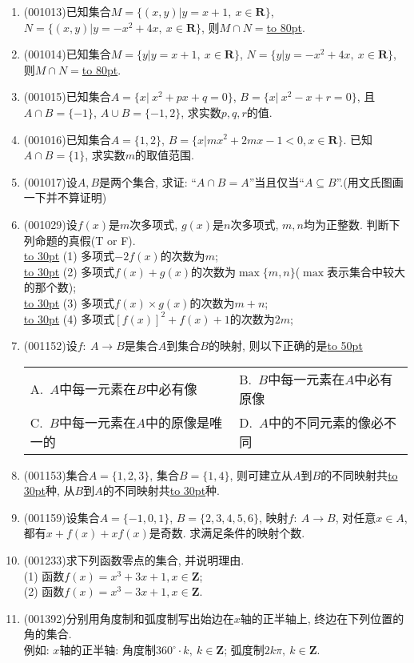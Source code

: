 \documentclass[10pt,a4paper]{article}
\newcommand{\blank}[1]{\underline{\hbox to #1pt{}}}
\newcommand{\twoch}[4]{\par\begin{tabular}{p{.46\textwidth}p{.46\textwidth}}
A.~#1& B.~#2\\
C.~#3& D.~#4
\end{tabular}}
\begin{document}
\begin{enumerate}[1.]
3. \blank{200};4. \blank{200}.
\item {\tiny (001013)}已知集合$M=\{(x,y)|y=x+1, \ x \in \mathbf{R}\}$, $N=\{(x,y)|y=-x^2+4x,\  x \in \mathbf{R}\}$,
则$M \cap N=$\blank{80}.
\item {\tiny (001014)}已知集合$M=\{y|y=x+1, \ x \in \mathbf{R}\}$, $N=\{y|y=-x^2+4x,\  x \in \mathbf{R}\}$,
则$M \cap N=$\blank{80}.
\item {\tiny (001015)}已知集合$A=\{x|\ x^2+px+q=0\}$, $B=\{x|\ x^2-x+r=0\}$, 且$A\cap B=\{-1\}$, $A\cup B=\{-1,2\}$, 求实数$p,q,r$的值.
\item {\tiny (001016)}已知集合$A=\{1,2\}$, $B=\{x|mx^2+2mx-1<0, x \in\mathbf{R}\}$. 已知$A \cap B=\{1\}$, 求实数$m$的取值范围.
\item {\tiny (001017)}设$A,B$是两个集合, 求证: ``$A\cap B=A$''当且仅当``$A \subseteq B$''.(用文氏图画一下并不算证明)
\item {\tiny (001029)}设$f(x)$是$m$次多项式, $g(x)$是$n$次多项式, $m,n$均为正整数. 判断下列命题的真假(T or F).\\ 
\blank{30} (1) 多项式$-2f(x)$的次数为$m$;\\ 
\blank{30} (2) 多项式$f(x)+g(x)$的次数为$\max\{m,n\}$($\max$表示集合中较大的那个数);\\ 
\blank{30} (3) 多项式$f(x)\times g(x)$的次数为$m+n$;\\ 
\blank{30} (4) 多项式$[f(x)]^2+f(x)+1$的次数为$2m$;
\item {\tiny (001152)}设$f:\ A\rightarrow B$是集合$A$到集合$B$的映射, 则以下正确的是\blank{50}
\twoch{$A$中每一元素在$B$中必有像}{$B$中每一元素在$A$中必有原像}{$B$中每一元素在$A$中的原像是唯一的}{$A$中的不同元素的像必不同}
\item {\tiny (001153)}集合$A=\{1,2,3\}$, 集合$B=\{1,4\}$, 则可建立从$A$到$B$的不同映射共\blank{30}种, 从$B$到$A$的不同映射共\blank{30}种.
\item {\tiny (001159)}设集合$A=\{-1, 0, 1\}$, $B=\{2,3,4,5,6\}$, 映射$f:\ A\rightarrow B$, 对任意$x\in A$, 都有$x+f(x)+xf(x)$是奇数. 求满足条件的映射个数.
\item {\tiny (001233)}求下列函数零点的集合, 并说明理由.\\ 
(1) 函数$f(x)=x^3+3x+1,x\in\mathbf{Z}$;\\ 
(2) 函数$f(x)=x^3-3x+1,x\in\mathbf{Z}$.
\item {\tiny (001392)}分别用角度制和弧度制写出始边在$x$轴的正半轴上, 终边在下列位置的角的集合.\\ 
例如: $x$轴的正半轴: 角度制\underline{$360^\circ \cdot k, \ k\in \mathbf{Z}$}; 弧度制\underline{$2k\pi, \ k\in \mathbf{Z}$}.

\end{enumerate}
\end{document}
